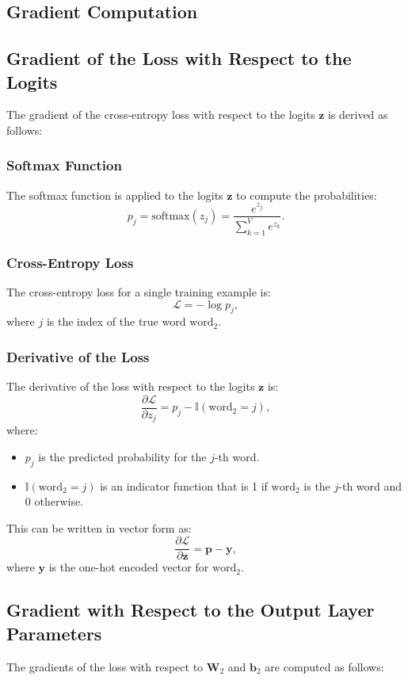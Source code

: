 \begin{notechapter}
\section{Gradient Computation}
\subsection{Gradient of the Loss with Respect to the Logits}
The gradient of the cross-entropy loss with respect to the logits \(\mathbf{z}\)
is derived as follows:

\subsubsection{Softmax Function}
The softmax function is applied to the logits \(\mathbf{z}\) to compute the
probabilities:
\[
p_j = \text{softmax}(z_j) = \frac{e^{z_j}}{\sum_{k=1}^V e^{z_k}}.
\]

\subsubsection{Cross-Entropy Loss}
The cross-entropy loss for a single training example is:
\[
\mathcal{L} = -\log p_j,
\]
where \(j\) is the index of the true word \(\text{word}_2\).

\subsubsection{Derivative of the Loss}
The derivative of the loss with respect to the logits \(\mathbf{z}\) is:
\[
\frac{\partial \mathcal{L}}{\partial z_j} = p_j - \mathbb{I}(\text{word}_2 = j),
\]
where:
\begin{itemize}
    \item \(p_j\) is the predicted probability for the \(j\)-th word.
    \item \(\mathbb{I}(\text{word}_2 = j)\) is an indicator function that is 1
          if \(\text{word}_2\) is the \(j\)-th word and 0 otherwise.
\end{itemize}

This can be written in vector form as:
\[
\frac{\partial \mathcal{L}}{\partial \mathbf{z}} = \mathbf{p} - \mathbf{y},
\]
where \(\mathbf{y}\) is the one-hot encoded vector for \(\text{word}_2\).

\subsection{Gradient with Respect to the Output Layer Parameters}
The gradients of the loss with respect to \(\mathbf{W}_2\) and \(\mathbf{b}_2\)
are computed as follows:


\end{notechapter}
